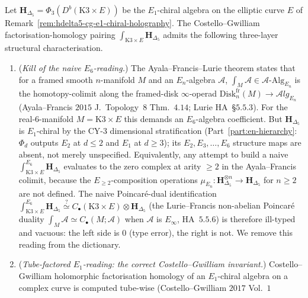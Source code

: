 \begin{proposition}
\label{prop:hochcalc-cg-fact-hom-k3xE-hdelta5-tube-genus2}
Let $\mathbf H_{\Delta_5}=\Phi_3(D^b(\mathrm K3\times E))$ be the
$E_1$-chiral algebra on the elliptic curve $E$ of
Remark~\ref{rem:hdelta5-cg-e1-chiral-holography}. The
Costello--Gwilliam factorisation-homology pairing
$\int_{\mathrm K3\times E}\mathbf H_{\Delta_5}$ admits the following
three-layer structural characterisation.
\begin{enumerate}[label=(\alph*),leftmargin=1.5em]
 \item (\emph{Kill of the naive $E_6$-reading.}) The
 Ayala--Francis--Lurie theorem states that for a framed smooth
 $n$-manifold $M$ and an $E_n$-algebra $\mathcal A$,
 $\int_M\mathcal A\in\mathcal A\text{-Alg}_{E_n}$ is the
 homotopy-colimit along the framed-disk $\infty$-operad
 $\mathrm{Disk}_n^{\mathrm{fr}}(M)\to\mathcal Alg_{E_n}$
 (Ayala--Francis $2015$ J.\ Topology~$8$ Thm.\ $4.14$;
 Lurie HA~\S$5.5.3$). For the real-$6$-manifold $M=\mathrm K3\times E$
 this demands an $E_6$-algebra coefficient. But $\mathbf H_{\Delta_5}$
 is $E_1$-chiral by the CY-$3$ dimensional stratification
 (Part~\ref{part:en-hierarchy}: $\Phi_d$ outputs $E_2$ at $d\leq 2$
 and $E_1$ at $d\geq 3$); its $E_2,E_3,\ldots,E_6$ structure maps
 are absent, not merely unspecified. Equivalently, any attempt to
 build a naive $\int_{\mathrm K3\times E}^{E_6}\mathbf H_{\Delta_5}$
 evaluates to the zero complex at arity $\geq 2$ in the
 Ayala--Francis colimit, because the $E_{\geq 2}$-composition
 operations $\mu_{E_n}:\mathbf H_{\Delta_5}^{\otimes n}\to\mathbf
 H_{\Delta_5}$ for $n\geq 2$ are not defined. The naive
 Poincar\'e-dual identification
 $\int_{\mathrm K3\times E}^{E_6}\mathbf H_{\Delta_5}
 \stackrel?\simeq
 C_\bullet(\mathrm K3\times E)\otimes\mathbf H_{\Delta_5}$
 (the Lurie--Francis non-abelian Poincar\'e duality
 $\int_M\mathcal A\simeq C_\bullet(M;\mathcal A)$ when $\mathcal A$
 is $E_\infty$, HA~$5.5.6$) is therefore ill-typed and vacuous: the
 left side is $0$ (type error), the right is not. We remove this
 reading from the dictionary.
 \item (\emph{Tube-factored $E_1$-reading: the correct
 Costello--Gwilliam invariant.}) Costello--Gwilliam holomorphic
 factorisation homology of an $E_1$-chiral algebra on a complex
 curve is computed tube-wise (Costello--Gwilliam $2017$ Vol.\ $1$

\end{enumerate}
\end{proposition}
